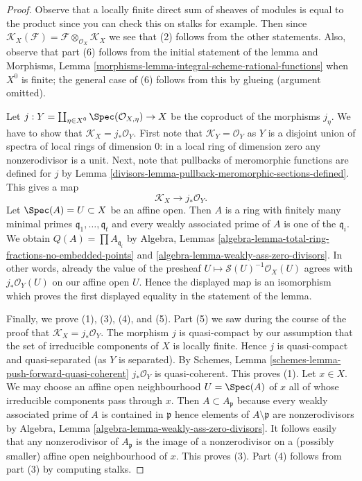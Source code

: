 \begin{proof}

Observe that a locally finite direct sum of sheaves of modules
is equal to the product since you can check this on stalks for
example. Then since $\mathcal{K}_X(\mathcal{F}) =
\mathcal{F} \otimes_{\mathcal{O}_X} \mathcal{K}_X$
we see that (2) follows from the other statements.
Also, observe that part (6) follows from the initial
statement of the lemma and Morphisms, Lemma
\ref{morphisms-lemma-integral-scheme-rational-functions}
when $X^0$ is finite; the general case of (6) follows from this
by glueing (argument omitted).

\medskip\noindent
Let $j : Y = \coprod\nolimits_{\eta \in X^0} \Spec(\mathcal{O}_{X, \eta}) \to X$
be the coproduct of the morphisms $j_\eta$. We have to show that
$\mathcal{K}_X = j_*\mathcal{O}_Y$.
First note that $\mathcal{K}_Y = \mathcal{O}_Y$ as $Y$ is a disjoint
union of spectra of local rings of dimension $0$: in a local
ring of dimension zero any nonzerodivisor is a unit.
Next, note that pullbacks of meromorphic
functions are defined for $j$ by
Lemma \ref{divisors-lemma-pullback-meromorphic-sections-defined}.
This gives a map
$$
\mathcal{K}_X \longrightarrow j_*\mathcal{O}_Y.
$$
Let $\Spec(A) = U \subset X$ be an affine open. Then $A$ is a ring
with finitely many minimal primes $\mathfrak q_1, \ldots, \mathfrak q_t$
and every weakly associated prime of $A$ is one of the $\mathfrak q_i$.
We obtain $Q(A) = \prod A_{\mathfrak q_i}$
by Algebra, Lemmas \ref{algebra-lemma-total-ring-fractions-no-embedded-points}
and \ref{algebra-lemma-weakly-ass-zero-divisors}.
In other words, already the value of the presheaf
$U \mapsto \mathcal{S}(U)^{-1}\mathcal{O}_X(U)$ agrees with
$j_*\mathcal{O}_Y(U)$ on our affine open $U$. Hence the displayed
map is an isomorphism which proves the first displayed equality in
the statement of the lemma.

\medskip\noindent
Finally, we prove (1), (3), (4), and (5).
Part (5) we saw during the course of the proof that
$\mathcal{K}_X = j_*\mathcal{O}_Y$.
The morphism $j$ is quasi-compact by our assumption
that the set of irreducible components of $X$ is locally finite.
Hence $j$ is quasi-compact and quasi-separated (as $Y$ is separated).
By Schemes, Lemma \ref{schemes-lemma-push-forward-quasi-coherent}
$j_*\mathcal{O}_Y$ is quasi-coherent. This proves (1).
Let $x \in X$. We may choose an affine open neighbourhood
$U = \Spec(A)$ of $x$ all of whose irreducible components
pass through $x$. Then $A \subset A_\mathfrak p$ because every
weakly associated prime of $A$ is contained in $\mathfrak p$
hence elements of $A \setminus \mathfrak p$ are nonzerodivisors
by Algebra, Lemma \ref{algebra-lemma-weakly-ass-zero-divisors}.
It follows easily that any nonzerodivisor of $A_\mathfrak p$
is the image of a nonzerodivisor on a (possibly smaller)
affine open neighbourhood of $x$. This proves (3).
Part (4) follows from part (3) by computing stalks.
\end{proof}

